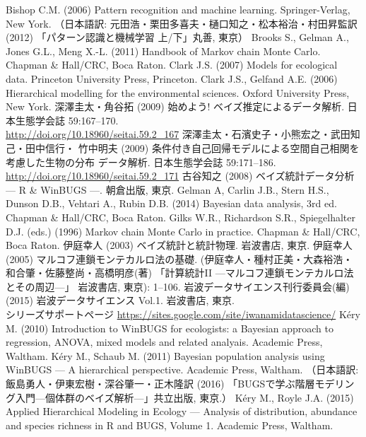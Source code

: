 \documentclass[11pt,uplatex]{jsarticle}
\begin{document}
\begin{thebibliography}{99}
 Bishop C.M. (2006) Pattern recognition and machine learning.
  Springer-Verlag, New York.
  （日本語訳: 元田浩・栗田多喜夫・樋口知之・松本裕治・村田昇監訳 (2012)
  「パターン認識と機械学習 上/下」丸善, 東京）
 Brooks S., Gelman A., Jones G.L., Meng X.-L. (2011)
Handbook of Markov chain Monte Carlo. Chapman \& Hall/CRC, Boca Raton. 
 Clark J.S. (2007) Models for ecological data.
  Princeton University Press, Princeton.
 Clark J.S., Gelfand A.E. (2006) Hierarchical modelling
  for the environmental sciences. Oxford University Press, New York.
 深澤圭太・角谷拓 (2009) 始めよう! ベイズ推定によるデータ解析.
  日本生態学会誌 59:167--170.\\
  \url{http://doi.org/10.18960/seitai.59.2_167}
 深澤圭太・石濱史子・小熊宏之・武田知己・田中信行・
  竹中明夫 (2009) 条件付き自己回帰モデルによる空間自己相関を考慮した生物の分布
  データ解析. 日本生態学会誌 59:171--186. \\
  \url{http://doi.org/10.18960/seitai.59.2_171}
 古谷知之 (2008) ベイズ統計データ分析 --- R \& WinBUGS ---.
  朝倉出版, 東京.
 Gelman A, Carlin J.B., Stern H.S., Dunson D.B., Vehtari A.,
  Rubin D.B. (2014) Bayesian data analysis, 3rd ed.
  Chapman \& Hall/CRC, Boca Raton.
 Gilks W.R., Richardson S.R., Spiegelhalter D.J. (eds.) (1996)
  Markov chain Monte Carlo in practice. Chapman \& Hall/CRC, Boca Raton.
 伊庭幸人 (2003) ベイズ統計と統計物理. 岩波書店, 東京.
 伊庭幸人 (2005) マルコフ連鎖モンテカルロ法の基礎. 
  (伊庭幸人・種村正美・大森裕浩・和合肇・佐藤整尚・高橋明彦(著)
  「計算統計II ---マルコフ連鎖モンテカルロ法とその周辺---」
  岩波書店, 東京): 1--106.
 岩波データサイエンス刊行委員会(編) (2015) 岩波データサイエンス Vol.1.
岩波書店, 東京. \\
シリーズサポートページ \url{https://sites.google.com/site/iwanamidatascience/}
 K\'ery M. (2010) Introduction to WinBUGS for ecologists:
  a Bayesian approach to regression, ANOVA, mixed models and related analyais.
  Academic Press, Waltham.
 K\'ery M., Schaub M. (2011) Bayesian population analysis using WinBUGS --- A hierarchical perspective.
  Academic Press, Waltham.
    （日本語訳: 飯島勇人・伊東宏樹・深谷肇一・正木隆訳 (2016) 「BUGSで学ぶ階層モデリング入門---個体群のベイズ解析---」共立出版, 東京.）
 K\'ery M., Royle J.A. (2015) Applied Hierarchical Modeling in Ecology --- Analysis of distribution, abundance and species richness in R and BUGS, Volume 1. Academic Press, Waltham.

\end{thebibliography}
\end{document}
